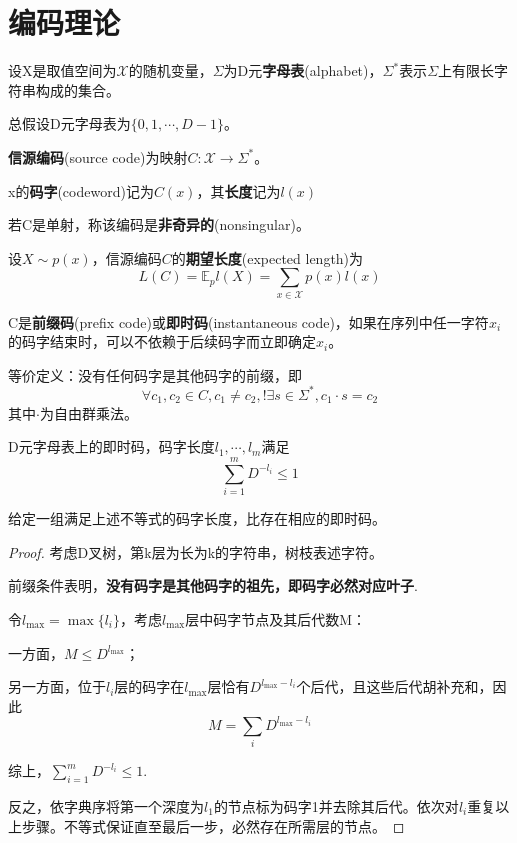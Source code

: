 \documentclass{ctexbook}
\begin{document}
\section{编码理论}

\begin{definition}[字母表]
    设X是取值空间为$\mathcal{X} $的随机变量，$\Sigma$为D元\textbf{字母表}(alphabet)，$\Sigma^*$表示$\Sigma$上有限长字符串构成的集合。

    总假设D元字母表为$\{0,1,\cdots,D-1\}$。
\end{definition}

\begin{definition}[信源编码]
    \textbf{信源编码}(source code)为映射$C:\mathcal{X} \to \Sigma^*$。

    x的\textbf{码字}(codeword)记为$C(x)$，其\textbf{长度}记为$l(x)$

    若C是单射，称该编码是\textbf{非奇异的}(nonsingular)。
\end{definition}

\begin{definition}[期望长度]
    设$X\sim p(x)$，信源编码$C$的\textbf{期望长度}(expected length)为
    \[L(C)=\mathbb{E} _pl(X)=\sum_{x\in\mathcal{X} }p(x)l(x)\]
\end{definition}

\begin{definition}[前缀码]
    C是\textbf{前缀码}(prefix code)或\textbf{即时码}(instantaneous code)，如果在序列中任一字符$x_i$的码字结束时，可以不依赖于后续码字而立即确定$x_i$。

    等价定义：没有任何码字是其他码字的前缀，即
    \[\forall c_1,c_2\in C,c_1\neq c_2,!\exists s\in \Sigma^*,c_1\cdot s=c_2\]
    其中$\cdot$为自由群乘法。
\end{definition}

\begin{theorem}[Kraft不等式]
    D元字母表上的即时码，码字长度$l_1,\cdots,l_m$满足
    \[\sum_{i=1}^{m}D^{-l_i}\leq 1\]

    给定一组满足上述不等式的码字长度，比存在相应的即时码。
\end{theorem}
\begin{proof}
    考虑D叉树，第k层为长为k的字符串，树枝表述字符。

    前缀条件表明，\textbf{没有码字是其他码字的祖先，即码字必然对应叶子}.

    令$l_{\max}=\max\{l_i\}$，考虑$l_{\max}$层中码字节点及其后代数M：

    一方面，$M\leq D^{l_{\max}}$；

    另一方面，位于$l_i$层的码字在$l_{\max}$层恰有$D^{l_{\max}-l_i}$个后代，且这些后代胡补充和，因此
    $$M=\sum_{i}D^{l_{\max}-l_i}$$

    综上，$\sum_{i=1}^{m}D^{-l_i}\leq 1$.

    反之，依字典序将第一个深度为$l_1$的节点标为码字1并去除其后代。依次对$l_i$重复以上步骤。不等式保证直至最后一步，必然存在所需层的节点。
\end{proof}
\end{document}
